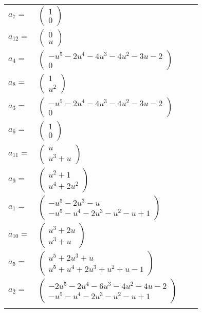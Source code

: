 \documentclass[1p]{elsarticle_modified}
\theoremstyle{definition}
\begin{document}
\begin{tabular}{m{7pt} m{180pt} m{7pt} m{180pt} }
\flushright $a_{7}=$&$\begin{pmatrix}1\\0\end{pmatrix}$ \\
\flushright $a_{12}=$&$\begin{pmatrix}0\\u\end{pmatrix}$ \\
\flushright $a_{4}=$&$\begin{pmatrix}- u^5-2 u^4-4 u^3-4 u^2-3 u-2\\0\end{pmatrix}$ \\
\flushright $a_{8}=$&$\begin{pmatrix}1\\u^2\end{pmatrix}$ \\
\flushright $a_{3}=$&$\begin{pmatrix}- u^5-2 u^4-4 u^3-4 u^2-3 u-2\\0\end{pmatrix}$ \\
\flushright $a_{6}=$&$\begin{pmatrix}1\\0\end{pmatrix}$ \\
\flushright $a_{11}=$&$\begin{pmatrix}u\\u^3+u\end{pmatrix}$ \\
\flushright $a_{9}=$&$\begin{pmatrix}u^2+1\\u^4+2 u^2\end{pmatrix}$ \\
\flushright $a_{1}=$&$\begin{pmatrix}- u^5-2 u^3- u\\- u^5- u^4-2 u^3- u^2- u+1\end{pmatrix}$ \\
\flushright $a_{10}=$&$\begin{pmatrix}u^3+2 u\\u^3+u\end{pmatrix}$ \\
\flushright $a_{5}=$&$\begin{pmatrix}u^5+2 u^3+u\\u^5+u^4+2 u^3+u^2+u-1\end{pmatrix}$ \\
\flushright $a_{2}=$&$\begin{pmatrix}-2 u^5-2 u^4-6 u^3-4 u^2-4 u-2\\- u^5- u^4-2 u^3- u^2- u+1\end{pmatrix}$\\&\end{tabular}
\end{document}
